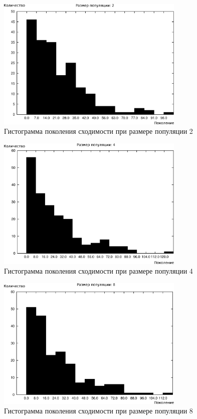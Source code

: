 \begin{figure}[h!]
\centering
\includegraphics[width=0.8\textwidth]{science/histogram2}
\caption{Гистограмма поколения сходимости при размере популяции 2}
\label{figure:histogram2}
\end{figure}

\begin{figure}[h!]
\centering
\includegraphics[width=0.8\textwidth]{science/histogram4}
\caption{Гистограмма поколения сходимости при размере популяции 4}
\label{figure:histogram4}
\end{figure}

\begin{figure}[h!]
\centering
\includegraphics[width=0.8\textwidth]{science/histogram8}
\caption{Гистограмма поколения сходимости при размере популяции 8}
\label{figure:histogram8}
\end{figure}

